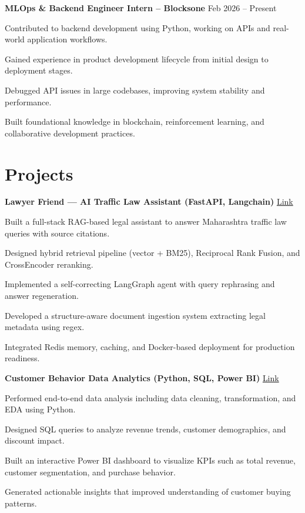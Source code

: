 \documentclass[letterpaper,10pt]{article}
\newenvironment{resume_list}{
  \vspace{-4pt}
  \begin{itemize}[leftmargin=18pt, itemsep=-3pt]
}{
  \end{itemize}
}
\begin{document}
\textbf{MLOps \& Backend Engineer Intern – Blocksone} \hfill Feb 2026 – Present
\begin{resume_list}
  \item Contributed to backend development using Python, working on APIs and real-world application workflows.
  \item Gained experience in product development lifecycle from initial design to deployment stages.
  \item Debugged API issues in large codebases, improving system stability and performance.
  \item Built foundational knowledge in blockchain, reinforcement learning, and collaborative development practices.
\end{resume_list}


\section*{Projects}

\textbf{Lawyer Friend — AI Traffic Law Assistant (FastAPI, Langchain)} 
\hfill \href{https://huggingface.co/spaces/krushna101211/traffic-lawyer}{Link}
\begin{resume_list}
  \item Built a full-stack RAG-based legal assistant to answer Maharashtra traffic law queries with source citations.
  \item Designed hybrid retrieval pipeline (vector + BM25), Reciprocal Rank Fusion, and CrossEncoder reranking.
  \item Implemented a self-correcting LangGraph agent with query rephrasing and answer regeneration.
  \item Developed a structure-aware document ingestion system extracting legal metadata using regex.
  \item Integrated Redis memory, caching, and Docker-based deployment for production readiness.
\end{resume_list}

\textbf{Customer Behavior Data Analytics (Python, SQL, Power BI)} 
\hfill \href{https://github.com/Krishna101211/Customer-behaviour-/blob/main/customer_behavior_dashboard.pdf}{Link}
\begin{resume_list}
  \item Performed end-to-end data analysis including data cleaning, transformation, and EDA using Python.
  \item Designed SQL queries to analyze revenue trends, customer demographics, and discount impact.
  \item Built an interactive Power BI dashboard to visualize KPIs such as total revenue, customer segmentation, and purchase behavior.
  \item Generated actionable insights that improved understanding of customer buying patterns.
\end{resume_list}
\end{document}
